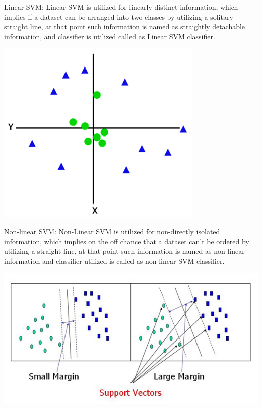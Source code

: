 \documentclass[a4paper,12pt]{report}
\begin{document}
Linear SVM: Linear SVM is utilized for linearly distinct information, which implies if a dataset can be arranged into two classes by utilizing a solitary straight line, at that point such information is named as straightly detachable information, and classifier is utilized called as Linear SVM classifier.

\begin{center}
    \captionsetup{type=figure}
    \includegraphics[width=.9\linewidth]{media/trianglecricle.png}
\end{center}

Non-linear SVM: Non-Linear SVM is utilized for non-directly isolated information, which implies on the off chance that a dataset can't be ordered by utilizing a straight line, at that point such information is named as non-linear information and classifier utilized is called as non-linear SVM classifier.

\begin{center}
    \captionsetup{type=figure}
    \includegraphics[width=.9\linewidth]{media/smalllargemargin.png}
\end{center}
\end{document}
